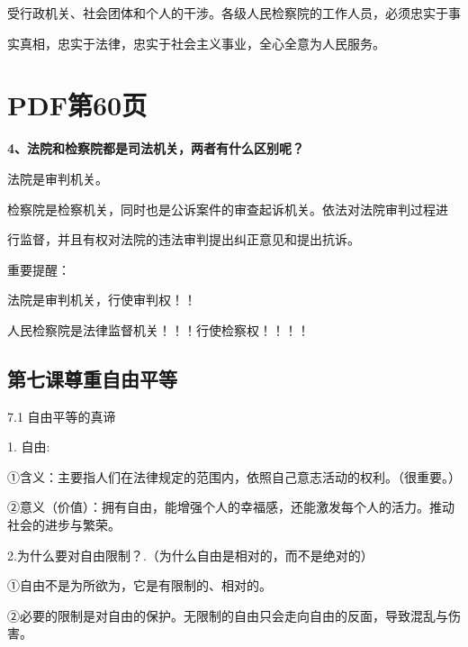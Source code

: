 \documentclass[lang=cn,11pt]{elegantbook}
\newcommand{\daofasym}[1]{{\daofasymbolfont #1}}
\newcommand{\daofasym}[1]{#1}
\begin{document}
受行政机关、社会团体和个人的干涉。各级人民检察院的工作人员，必须忠实于事\par

实真相，忠实于法律，忠实于社会主义事业，全心全意为人民服务。\par


\section*{PDF第60页}

\textbf{4、法院和检察院都是司法机关，两者有什么区别呢？}\par

法院是审判机关。\par

检察院是检察机关，同时也是公诉案件的审查起诉机关。依法对法院审判过程进\par

行监督，并且有权对法院的违法审判提出纠正意见和提出抗诉。\par

重要提醒：\par

法院是审判机关，行使审判权！！\par

人民检察院是法律监督机关！！！行使检察权！！！！\par

\subsection*{第七课尊重自由平等}

7.1 自由平等的真谛\par

1. 自由:\par

\daofasym{①}含义：主要指人们在法律规定的范围内，依照自己意志活动的权利。（很重要。）\par

\daofasym{②}意义（价值）：拥有自由，能增强个人的幸福感，还能激发每个人的活力。推动社会的进步与繁荣。\par

2.为什么要对自由限制？.（为什么自由是相对的，而不是绝对的）\par

\daofasym{①}自由不是为所欲为，它是有限制的、相对的。\par

\daofasym{②}必要的限制是对自由的保护。无限制的自由只会走向自由的反面，导致混乱与伤害。\par
\end{document}
